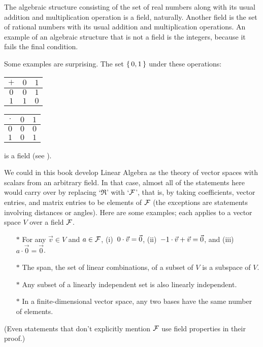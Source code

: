 The algebraic structure 
consisting of the set of real numbers along with its usual
addition and multiplication operation is a field, naturally.
Another field is the set of rational numbers with its usual addition
and multiplication operations.
An example of an algebraic structure that is not a field is
the integers, because it fails the final condition.

Some examples are surprising.
The set \( \mbox{$\{\,0,1\,\}$} \) under these operations:
\begin{center}
  \begin{tabular}{c|cc}
    \( + \) &\( 0 \) &\( 1 \) \\
    \hline
    \( 0 \) &\( 0 \) &\( 1 \) \\
    \( 1 \) &\( 1 \) &\( 0 \)
  \end{tabular}
  \qquad
  \begin{tabular}{c|cc}
    \( \cdot \) &\( 0 \) &\( 1 \) \\
     \hline
       \( 0 \)  &\( 0 \) &\( 0 \)  \\
       \( 1 \)  &\( 0 \) &\( 1 \)
  \end{tabular}
\end{center}
is a field (see ).

We could in this book develop Linear Algebra as the theory of
vector spaces with scalars from an arbitrary field.
In that case, 
almost all of the statements here would carry over by replacing
`\( \Re \)' with `\( \mathcal{F} \)', that is, by
taking coefficients, vector entries,
and matrix entries to be elements of \( \mathcal{F} \)
(the exceptions are statements involving distances or angles).
Here are some examples; each applies to a vector space \( V \)
over a field \( \mathcal{F} \).
\begin{itemize}
  \item[$*$] For any \( \vec{v}\in V \) and \( a\in\mathcal{F} \),
  (i)~\( 0\cdot\vec{v}=\vec{0} \),
  (ii)~\( -1\cdot\vec{v}+\vec{v}=\vec{0} \),
  and (iii)~\( a\cdot\vec{0}=\vec{0} \).

  \item[$*$] The span, the set of linear combinations, of a subset of \( V \)
  is a subspace of \( V \).

  \item[$*$] Any subset of a linearly independent set is also 
     linearly independent.

  \item[$*$] In a finite-dimensional vector space, 
    any two bases have the same number of elements.
\end{itemize}
(Even statements that don't explicitly mention \( \mathcal{F} \) use
field properties in their proof.)

